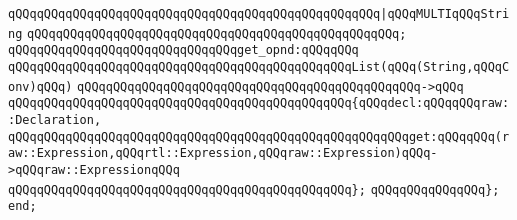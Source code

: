 \verb|qQQqqQQqqQQqqQQqqQQqqQQqqQQqqQQqqQQqqQQqqQQqqQQqqQQq|\verb#|qQQqMULTIqQQqString#\newline
\verb|qQQqqQQqqQQqqQQqqQQqqQQqqQQqqQQqqQQqqQQqqQQqqQQqqQQq;|\newline
\newline
\verb|qQQqqQQqqQQqqQQqqQQqqQQqqQQqqQQqget_opnd:qQQqqQQq|\newline
\verb|qQQqqQQqqQQqqQQqqQQqqQQqqQQqqQQqqQQqqQQqqQQqqQQqList(qQQq(String,qQQqConv)qQQq)|\newline
\verb|qQQqqQQqqQQqqQQqqQQqqQQqqQQqqQQqqQQqqQQqqQQqqQQq->qQQq|\newline
\verb|qQQqqQQqqQQqqQQqqQQqqQQqqQQqqQQqqQQqqQQqqQQqqQQq{qQQqdecl:qQQqqQQqraw::Declaration,|\newline
\verb|qQQqqQQqqQQqqQQqqQQqqQQqqQQqqQQqqQQqqQQqqQQqqQQqqQQqqQQqget:qQQqqQQq(raw::Expression,qQQqrtl::Expression,qQQqraw::Expression)qQQq->qQQqraw::ExpressionqQQq|\newline
\verb|qQQqqQQqqQQqqQQqqQQqqQQqqQQqqQQqqQQqqQQqqQQqqQQq};|\newline
\newline
\verb|qQQqqQQqqQQqqQQq};|\newline
\verb|end;|\newline


